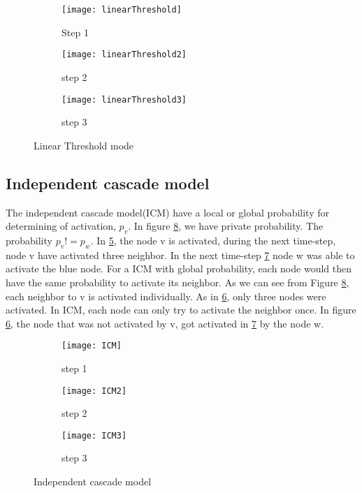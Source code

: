 {\begin{figure}[!ht]
	\begin{subfigure}{0.3\textwidth}
		\texttt{[image: linearThreshold]}
		\caption{Step 1 } 
		\label{fig:linearThresh}
	\end{subfigure}
	\begin{subfigure}{0.3\textwidth}
		\texttt{[image: linearThreshold2]}
		\caption{step 2 } 
		\label{fig:linearThresh2}
	\end{subfigure}
	\begin{subfigure}{0.3\textwidth}
		\texttt{[image: linearThreshold3]}
		\caption{step 3} 
		\label{fig:linearThresh3}
	\end{subfigure}
	\caption{Linear Threshold mode}
\end{figure}

\subsection{Independent cascade model}
The independent cascade model(ICM) have a local or global probability for determining of activation, $p_v$. In figure \ref{fig:ICM_step}, we have private probability. The probability $p_v != p_w$. In \ref{fig:ICM}, the node v is activated, during the next time-step, node v have activated three neighbor. In the next time-step \ref{fig:ICM3} node w was able to activate the blue node. For a ICM with global probability, each node would then have the same probability to activate its neighbor. As we can see from Figure \ref{fig:ICM_step}, each neighbor to v is activated individually. As in \ref{fig:ICM2}, only three nodes were activated. In ICM, each node can only try to activate the neighbor once. In figure \ref{fig:ICM2}, the node that was not activated by v, got activated in \ref{fig:ICM3} by the node w.


\begin{figure}[!ht]
	\begin{subfigure}{0.3\textwidth}
		\texttt{[image: ICM]}
		\caption{step 1 } 
		\label{fig:ICM}
	\end{subfigure}
	\begin{subfigure}{0.3\textwidth}
		\texttt{[image: ICM2]}
		\caption{step 2} 
		\label{fig:ICM2}
	\end{subfigure}
	\begin{subfigure}{0.3\textwidth}
		\texttt{[image: ICM3]}
		\caption{step 3} 
		\label{fig:ICM3}
	\end{subfigure}
	\caption{Independent cascade model}
	\label{fig:ICM_step}
\end{figure}

}
